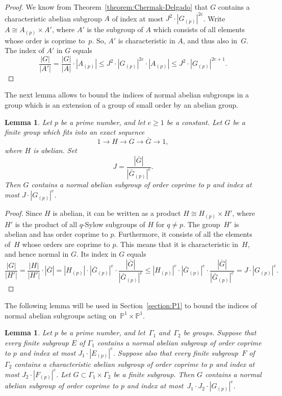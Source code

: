 \documentclass[12pt]{amsart}
\numberwithin{equation}{section}
\newtheorem{lemma}[subsection]{Lemma}
\theoremstyle{definition}
\newcommand{\PP}{\mathbb P}
\def \ge {\geqslant}
\def \le {\leqslant}
\begin{document}
\begin{proof}
We know from Theorem~\ref{theorem:Chermak-Delgado} that $G$ contains
a characteristic abelian subgroup $A$ of index at most
$J^2\cdot |G_{(p)}|^{2e}$. Write $A\cong A_{(p)}\times A'$,
where $A'$ is the subgroup of $A$ which consists of all elements whose
order is coprime to~$p$. So, $A'$ is characteristic in $A$, and thus also in~$G$.
The index of $A'$ in $G$ equals
$$
\frac{|G|}{|A'|}=\frac{|G|}{|A|}\cdot |A_{(p)}|\le J^2\cdot |G_{(p)}|^{2e}\cdot |A_{(p)}|
\le J^2\cdot |G_{(p)}|^{2e+1}.
$$
\end{proof}





The next lemma allows to bound the indices of normal abelian subgroups in a group
which is an extension of a group of small order by an abelian group.

\begin{lemma}\label{lemma:large-abelian}
Let $p$ be a prime number, and let $e\ge 1$ be a constant.
Let $G$ be a finite group which fits into an exact sequence
$$
1\to H\to G\to \bar{G}\to 1,
$$
where $H$ is abelian. Set
$$
J=\frac{|\bar{G}|}{|\bar{G}_{(p)}|^e}.
$$
Then $G$ contains a normal abelian subgroup of order coprime to $p$ and index
at most $J\cdot |G_{(p)}|^e$.
\end{lemma}

\begin{proof}
Since $H$ is abelian, it can be written as a product
$H\cong H_{(p)}\times H'$, where~$H'$ is the product of all $q$-Sylow subgroups
of $H$ for $q\neq p$. The group~$H'$ is abelian and has order coprime to $p$.
Furthermore, it consists of all the elements of~$H$ whose orders are coprime to $p$.
This means that it is characteristic in~$H$, and hence normal in $G$.
Its index in $G$ equals
$$
\frac{|G|}{|H'|}=\frac{|H|}{|H'|}\cdot |\bar{G}|=
|H_{(p)}|\cdot |\bar{G}_{(p)}|^e\cdot\frac{|\bar{G}|}{|\bar{G}_{(p)}|^e}\le
|H_{(p)}|^e\cdot |\bar{G}_{(p)}|^e\cdot\frac{|\bar{G}|}{|\bar{G}_{(p)}|^e}=
J\cdot |G_{(p)}|^e.
$$
\end{proof}

The following lemma will be used in Section~\ref{section:P1}
to bound the indices of normal abelian subgroups
acting on~$\PP^1\times\PP^1$.

\begin{lemma}
\label{lemma:product}
Let $p$ be a prime number, and let~$\Gamma_1$ and~$\Gamma_2$ be groups.
Suppose that every finite subgroup
$E$ of $\Gamma_1$ contains a normal abelian subgroup of order coprime to $p$
and index at most $J_1\cdot |E_{(p)}|^e$. Suppose also that every finite
subgroup~$F$ of~$\Gamma_2$ contains a characteristic
abelian subgroup of order coprime to $p$
and index at most $J_2\cdot |F_{(p)}|^e$.
Let $G\subset \Gamma_1\times\Gamma_2$ be a finite subgroup.
Then $G$ contains a normal abelian subgroup of order coprime to $p$
and index at most~\mbox{$J_1\cdot J_2\cdot |G_{(p)}|^e$}.
\end{lemma}
\end{document}
